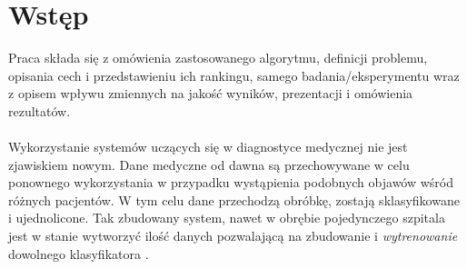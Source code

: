 \section{Wstęp}

Praca składa się z omówienia zastosowanego algorytmu, definicji problemu, opisania cech i przedstawieniu ich rankingu, samego badania/eksperymentu wraz z opisem wpływu zmiennych na jakość wyników, prezentacji i omówienia rezultatów. 
\\
\\
Wykorzystanie systemów uczących się w diagnostyce medycznej nie jest zjawiskiem nowym. Dane medyczne od dawna są przechowywane w celu ponownego wykorzystania w przypadku wystąpienia podobnych objawów wśród różnych pacjentów. W tym celu dane przechodzą obróbkę, zostają sklasyfikowane i ujednolicone. Tak zbudowany system, nawet w obrębie pojedynczego szpitala jest w stanie wytworzyć ilość danych pozwalającą na zbudowanie i \textit{wytrenowanie} dowolnego klasyfikatora \cite{1}.